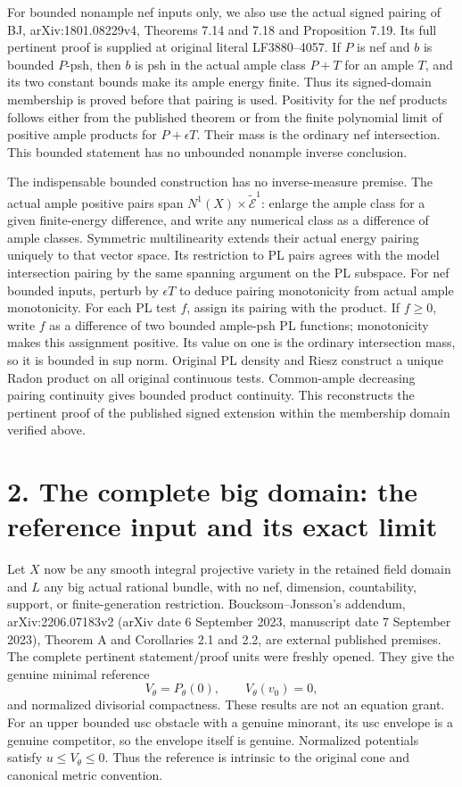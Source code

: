 \documentclass[
  10pt,
]{article}
\begin{document}
For bounded nonample nef inputs only, we also use the actual signed
pairing of BJ, arXiv:1801.08229v4, Theorems 7.14 and 7.18 and
Proposition 7.19. Its full pertinent proof is supplied at original
literal LF3880--4057. If \(P\) is nef and \(b\) is bounded \(P\)-psh,
then \(b\) is psh in the actual ample class \(P+T\) for an ample \(T\),
and its two constant bounds make its ample energy finite. Thus its
signed-domain membership is proved before that pairing is used.
Positivity for the nef products follows either from the published
theorem or from the finite polynomial limit of positive ample products
for \(P+\epsilon T\). Their mass is the ordinary nef intersection. This
bounded statement has no unbounded nonample inverse conclusion.

The indispensable bounded construction has no inverse-measure premise.
The actual ample positive pairs span
\(N^1(X)\times\widetilde{\mathcal E}^1\): enlarge the ample class for a
given finite-energy difference, and write any numerical class as a
difference of ample classes. Symmetric multilinearity extends their
actual energy pairing uniquely to that vector space. Its restriction to
PL pairs agrees with the model intersection pairing by the same spanning
argument on the PL subspace. For nef bounded inputs, perturb by
\(\epsilon T\) to deduce pairing monotonicity from actual ample
monotonicity. For each PL test \(f\), assign its pairing with the
product. If \(f\ge0\), write \(f\) as a difference of two bounded
ample-psh PL functions; monotonicity makes this assignment positive. Its
value on one is the ordinary intersection mass, so it is bounded in sup
norm. Original PL density and Riesz construct a unique Radon product on
all original continuous tests. Common-ample decreasing pairing
continuity gives bounded product continuity. This reconstructs the
pertinent proof of the published signed extension within the membership
domain verified above.

\section{2. The complete big domain: the reference input and its exact
limit}\label{the-complete-big-domain-the-reference-input-and-its-exact-limit}

Let \(X\) now be any smooth integral projective variety in the retained
field domain and \(L\) any big actual rational bundle, with no nef,
dimension, countability, support, or finite-generation restriction.
Boucksom--Jonsson's addendum, arXiv:2206.07183v2 (arXiv date 6 September
2023, manuscript date 7 September 2023), Theorem A and Corollaries 2.1
and 2.2, are external published premises. The complete pertinent
statement/proof units were freshly opened. They give the genuine minimal
reference \[V_\theta=P_\theta(0),\qquad V_\theta(v_0)=0,\] and
normalized divisorial compactness. These results are not an equation
grant. For an upper bounded usc obstacle with a genuine minorant, its
usc envelope is a genuine competitor, so the envelope itself is genuine.
Normalized potentials satisfy \(u\le V_\theta\le0\). Thus the reference
is intrinsic to the original cone and canonical metric convention.
\end{document}
